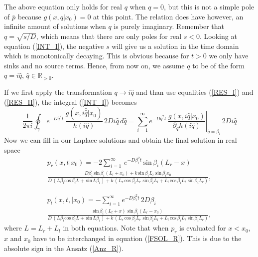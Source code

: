 The above equation only holds for real $q$ when $q = 0$, but this is not a simple pole of $\bar{p}$ because $g(x,q|x_0) = 0$ at this point. The relation does have however, an infinite amount of solutions when $q$ is purely imaginary. Remember that $q = \sqrt{s/D}$, which means that there are only poles for real $s < 0$. Looking at equation (\ref{INT_I}), the negative $s$ will give us a solution in the time domain which is monotonically decaying. This is obvious because for $t > 0$ we only have sinks and no source terms. Hence, from now on, we assume $q$ to be of the form $q = i \hat{q}, \, \hat{q} \in \mathbb{R}_{>0}$.

If we first apply the transformation $q \rightarrow i \hat{q}$ and than use equalities (\ref{RES_I}) and (\ref{RES_II}), the integral (\ref{INT_I}) becomes
\begin{equation} 
 \frac{1}{2 \pi i} \oint_{\gamma}
 \, e^{- D \hat{q}^2 t} \, \frac{g(x,i \hat{\hat{q}}|x_0)}{h(i \hat{q})} \, 2 D i \hat{q} \, d\hat{q} = \sum_{i=1}^{\infty} e^{ - D \hat{q}^2 t} \, \left. \frac{g(x,i \hat{q}|x_0)}{\partial_q h(i \hat{q})} \right|_{\hat{q} = \beta_i} \, 2 D i \hat{q}
\end{equation}
Now we can fill in our Laplace solutions and obtain the final solution in real space
\begin{multline}
 p_r(x,t|x_0) = -2 \sum_{i=1}^{\infty} \, e^{- D \beta_i ^2 t} \, \mathrm{sin} \, \beta_i (L_r - x) \\ 
\frac{D \beta_i \, \mathrm{sin} \, \beta_i (L_l + x_0) + k \, \mathrm{sin} \, \beta_i L_l \,\, \mathrm{sin} \, \beta_i x_0}{D \, (L \beta_i \mathrm{cos} \, \beta_i L + \, \mathrm{sin} \, L \beta_i ) + k \,( L_r \, \mathrm{cos} \, \beta_i L_r \,\, \mathrm{sin} \, \beta_i L_l + L_l \, \mathrm{cos} \, \beta_i L_l \,\, \mathrm{sin} \, \beta_i L_r )},
 \label{FSOL_R}
\end{multline}

\begin{multline}
 p_l(x,t,|x_0) = -\sum_{i=1}^{\infty} e^{- D \beta_i ^2 t} \, 2 D \beta_i \, \\ 
\frac{\mathrm{sin} \, \beta_i (L_l + x) \,\, \mathrm{sin} \, \beta_i (L_r - x_0)}{D \, (L \beta_i \mathrm{cos} \, \beta_i L + \, \mathrm{sin} \, L \beta_i ) + k \,( L_r \, \mathrm{cos} \, \beta_i L_r \,\, \mathrm{sin} \, \beta_i L_l + L_l \, \mathrm{cos} \, \beta_i L_l \,\, \mathrm{sin} \, \beta_i L_r )},
\label{FSOL_L}
\end{multline}
where $L=L_r + L_l$ in both equations. Note that when $p_r$ is evaluated for $x<x_0$, $x$ and $x_0$ have to be interchanged in equation (\ref{FSOL_R}). This is due to the absolute sign in the Ansatz (\ref{Anz_R}).

